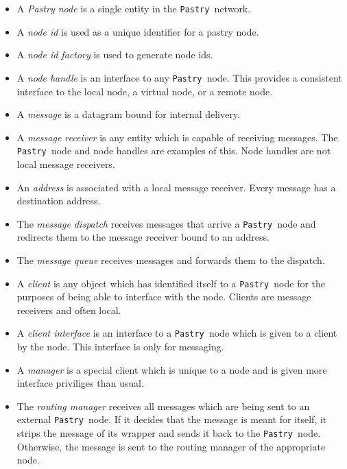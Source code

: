 \documentclass{article}
\newcommand{\pastry}{{\tt Pastry }}
\begin{document}
\begin{itemize}
\item A {\em Pastry node} is a single entity in the \pastry network.

\item A {\em node id} is used as a unique identifier for a pastry node.

\item A {\em node id factory} is used to generate node ids.

\item A {\em node handle} is an interface to any \pastry node.  This
provides a consistent interface to the local node, a virtual node, or
a remote node.

\item A {\em message} is a datagram bound for internal delivery.

\item A {\em message receiver} is any entity which is capable of
receiving messages.  The \pastry node and node handles are examples of
this.  Node handles are not local message receivers.

\item An {\em address} is associated with a local message receiver.
Every message has a destination address.

\item The {\em message dispatch} receives messages that arrive a
\pastry node and redirects them to the message receiver bound to an
address. 

\item The {\em message queue} receives messages and forwards them to
the dispatch.

\item A {\em client} is any object which has identified itself to a
\pastry node for the purposes of being able to interface with the
node.  Clients are message receivers and often local.

\item A {\em client interface} is an interface to a \pastry node which
is given to a client by the node.  This interface is only for
messaging.

\item A {\em manager} is a special client which is unique to
a node and is given more interface priviliges than usual.

\item The {\em routing manager} receives all messages which are being
sent to an external \pastry node.  If it decides that the message is meant
for itself, it strips the message of its wrapper and sends it back to
the \pastry node.  Otherwise, the message is sent to the routing
manager of the appropriate node.

\end{itemize}
\end{document}
